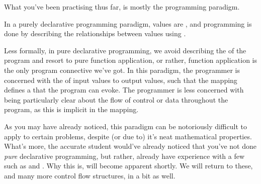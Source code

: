 What you've been practising thus far, is mostly the 
programming paradigm.

\begin{definition}

In a purely declarative programming paradigm, values are , and
programming is done by describing the relationships between values using
.

\end{definition}

Less formally, in pure declarative programming, we avoid describing the
 of the program and resort to pure function application, or rather,
function application is the only program connective we've got.  In this
paradigm, the programmer is concerned with the  of input values to
output values, such that the mapping defines a  that
the program can evoke.  The programmer is less concerned with being
particularly clear about the flow of control or data throughout the program, as
this is implicit in the mapping.

As you may have already noticed, this paradigm can be notoriously difficult to
apply to certain problems, despite (or due to) it's neat mathematical
properties.  What's more, the accurate student would've already noticed that
you've not done \emph{pure} declarative programming, but rather, already have
experience with a few  such as  and
 .  Why this is, will become
apparent shortly. We will return to these, and many more control flow
structures, in a bit as well.
